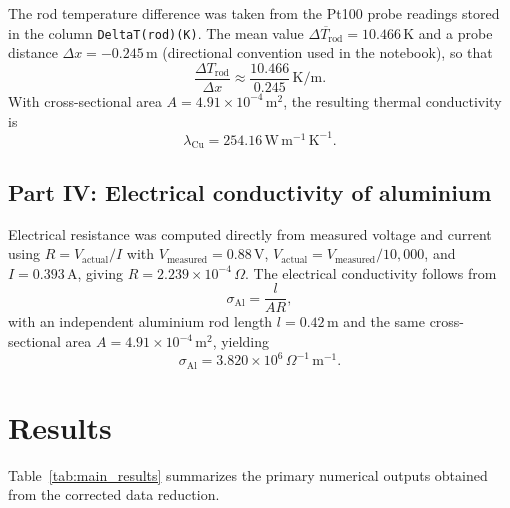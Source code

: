 \documentclass[journal]{IEEEtran}
\begin{document}
The rod temperature difference was taken from the Pt100 probe readings stored in the
column \texttt{DeltaT(rod)(K)}. The mean value
$\overline{\Delta T_{\text{rod}}}=10.466\,\text{K}$ and a probe distance
$\Delta x = -0.245\,\text{m}$ (directional convention used in the notebook), so that
\begin{equation}
    \frac{\Delta T_{\text{rod}}}{\Delta x} \approx \frac{10.466}{0.245}\,\text{K/m}.
\end{equation}
With cross-sectional area $A = 4.91\times 10^{-4}\,\text{m}^2$, the resulting thermal
conductivity is
\begin{equation}
    \lambda_{\text{Cu}} = 254.16\,\text{W}\,\text{m}^{-1}\,\text{K}^{-1}.
\end{equation}

\subsection{Part IV: Electrical conductivity of aluminium}
Electrical resistance was computed directly from measured voltage and current using
$R=V_{\text{actual}}/I$ with $V_{\text{measured}}=0.88\,\text{V}$,
$V_{\text{actual}}=V_{\text{measured}}/10{,}000$, and $I=0.393\,\text{A}$, giving
$R=2.239\times10^{-4}\,\Omega$. The electrical conductivity follows from
\begin{equation}
    \sigma_{\text{Al}} = \frac{l}{A R},
\end{equation}
with an independent aluminium rod length $l=0.42\,\text{m}$ and the same cross-sectional
area $A=4.91\times 10^{-4}\,\text{m}^2$, yielding
\begin{equation}
    \sigma_{\text{Al}} = 3.820\times10^{6}\,\Omega^{-1}\,\text{m}^{-1}.
\end{equation}

\section{Results}
Table~\ref{tab:main_results} summarizes the primary numerical outputs obtained from
the corrected data reduction.
\end{document}
